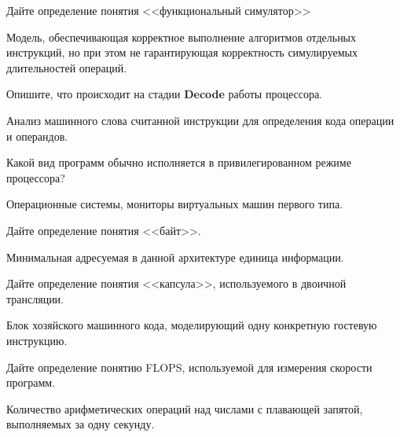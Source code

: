 \documentclass[a4paper, addpoints, answers]{exam}
\begin{document}
\begin{questions}


\question[3] Дайте определение понятия <<функциональный симулятор>>
\begin{solution}[2cm]
Модель, обеспечивающая корректное выполнение алгоритмов отдельных инструкций, но при этом не гарантирующая корректность симулируемых длительностей операций.
\end{solution}
    

\question[3] Опишите, что происходит на стадии \textbf{Decode} работы процессора.
\begin{solution}[1cm]
Анализ машинного слова считанной инструкции для определения кода операции и операндов.
\end{solution}




\question[3] Какой вид программ обычно исполняется в привилегированном режиме процессора?
\begin{solution}[1cm]
Операционные системы, мониторы виртуальных машин первого типа.
\end{solution}

\question[3] Дайте определение понятия <<байт>>.
\begin{solution}[1cm]
Минимальная адресуемая в данной архитектуре единица информации.
\end{solution}

\question[3] Дайте определение понятия <<капсула>>, используемого в двоичной трансляции.
\begin{solution}[1cm]
Блок хозяйского машинного кода, моделирующий одну конкретную гостевую инструкцию.
\end{solution}
    
\question[3] Дайте определение понятию FLOPS, используемой для измерения скорости программ.
\begin{solution}[1cm]
Количество арифметических операций над числами с плавающей запятой, выполняемых за одну секунду.
\end{solution}


\end{questions}
\end{document}
